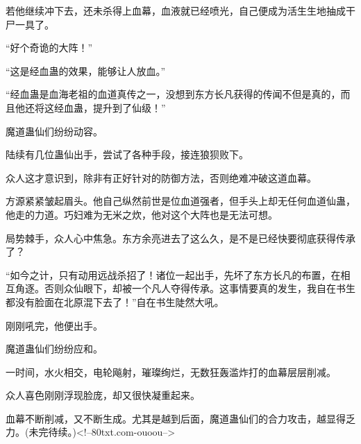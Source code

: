 \begin{this_body}
若他继续冲下去，还未杀得上血幕，血液就已经喷光，自己便成为活生生地抽成干尸一具了。

“好个奇诡的大阵！”

“这是经血蛊的效果，能够让人放血。”

“经血蛊是血海老祖的血道真传之一，没想到东方长凡获得的传闻不但是真的，而且他还将这经血蛊，提升到了仙级！”

魔道蛊仙们纷纷动容。

陆续有几位蛊仙出手，尝试了各种手段，接连狼狈败下。

众人这才意识到，除非有正好针对的防御方法，否则绝难冲破这道血幕。

方源紧紧皱起眉头。他自己纵然前世是位血道强者，但手头上却无任何血道仙蛊，他走的力道。巧妇难为无米之炊，他对这个大阵也是无法可想。

局势棘手，众人心中焦急。东方余亮进去了这么久，是不是已经快要彻底获得传承了？

“如今之计，只有动用远战杀招了！诸位一起出手，先坏了东方长凡的布置，在相互角逐。否则众仙眼下，却被一个凡人夺得传承。这事情要真的发生，我自在书生都没有脸面在北原混下去了！”自在书生陡然大吼。

刚刚吼完，他便出手。

魔道蛊仙们纷纷应和。

一时间，水火相交，电轮飚射，璀璨绚烂，无数狂轰滥炸打的血幕层层削减。

众人喜色刚刚浮现脸庞，却又很快凝重起来。

血幕不断削减，又不断生成。尤其是越到后面，魔道蛊仙们的合力攻击，越显得乏力。(未完待续。)<!--80txt.com-ouoou-->

\end{this_body}

